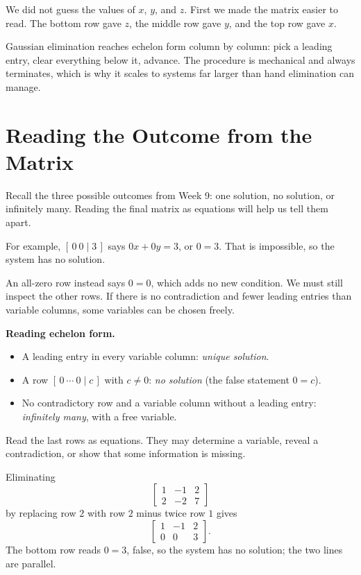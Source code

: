\documentclass[12pt]{book}
\begin{document}
We did not guess the values of $x$, $y$, and $z$.
First we made the matrix easier to read. The bottom row
gave $z$, the middle row gave $y$, and the top row gave $x$.

\begin{keyidea}
Gaussian elimination reaches echelon form column by column: pick a leading entry,
clear everything below it, advance. The procedure is mechanical and always
terminates, which is why it scales to systems far larger than hand elimination can
manage.
\end{keyidea}

\section{Reading the Outcome from the Matrix}

Recall the three possible outcomes from Week 9: one solution,
no solution, or infinitely many. Reading the final matrix as
equations will help us tell them apart.

For example, $[\,0\ 0\mid3\,]$ says $0x+0y=3$, or $0=3$.
That is impossible, so the system has no solution.

An all-zero row instead says $0=0$, which adds no new condition.
We must still inspect the other rows. If there is no
contradiction and fewer leading entries than variable
columns, some variables can be chosen freely.

\begin{keyidea}
\textbf{Reading echelon form.}
\begin{itemize}\setlength{\itemsep}{2pt}
  \item A leading entry in every variable column: \emph{unique solution}.
  \item A row $[\,0\ \cdots\ 0\mid c\,]$ with $c\neq0$: \emph{no solution}
        (the false statement $0=c$).
  \item No contradictory row and a variable column without a leading
        entry: \emph{infinitely many}, with a free variable.
\end{itemize}
\end{keyidea}

Read the last rows as equations. They may determine a variable,
reveal a contradiction, or show that some information is missing.

\begin{example}
Eliminating
\[
\left[\begin{array}{cc|c}
1&-1&2\\ 2&-2&7
\end{array}\right]
\]
by replacing row $2$ with row $2$ minus twice row $1$ gives
\[
\left[\begin{array}{cc|c}
1&-1&2\\ 0&0&3
\end{array}\right].
\]
The bottom row reads $0=3$, false, so the system has no solution; the two lines are
parallel.
\end{example}
\end{document}
